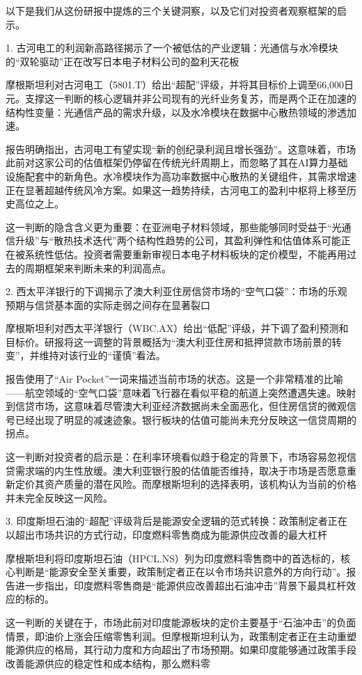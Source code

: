 \documentclass[11pt]{ctexart}
\begin{document}
以下是我们从这份研报中提炼的三个关键洞察，以及它们对投资者观察框架的启示。

1. 古河电工的利润新高路径揭示了一个被低估的产业逻辑：光通信与水冷模块的“双轮驱动”正在改写日本电子材料公司的盈利天花板

摩根斯坦利对古河电工（5801.T）给出“超配”评级，并将其目标价上调至66,000日元。支撑这一判断的核心逻辑并非公司现有的光纤业务复苏，而是两个正在加速的结构性变量：光通信产品的需求升级，以及水冷模块在数据中心散热领域的渗透加速。

报告明确指出，古河电工有望实现“新的创纪录利润且增长强劲”。这意味着，市场此前对这家公司的估值框架仍停留在传统光纤周期上，而忽略了其在AI算力基础设施配套中的新角色。水冷模块作为高功率数据中心散热的关键组件，其需求增速正在显著超越传统风冷方案。如果这一趋势持续，古河电工的盈利中枢将上移至历史高位之上。

这一判断的隐含含义更为重要：在亚洲电子材料领域，那些能够同时受益于“光通信升级”与“散热技术迭代”两个结构性趋势的公司，其盈利弹性和估值体系可能正在被系统性低估。投资者需要重新审视日本电子材料板块的定价模型，不能再用过去的周期框架来判断未来的利润高点。

2. 西太平洋银行的下调揭示了澳大利亚住房信贷市场的“空气口袋”：市场的乐观预期与信贷基本面的实际走弱之间存在显著裂口

摩根斯坦利对西太平洋银行（WBC.AX）给出“低配”评级，并下调了盈利预测和目标价。研报将这一调整的背景概括为“澳大利亚住房和抵押贷款市场前景的转变”，并维持对该行业的“谨慎”看法。

报告使用了“Air Pocket”一词来描述当前市场的状态。这是一个非常精准的比喻——航空领域的“空气口袋”意味着飞行器在看似平稳的航道上突然遭遇失速。映射到信贷市场，这意味着尽管澳大利亚经济数据尚未全面恶化，但住房信贷的微观信号已经出现了明显的减速迹象。银行板块的估值可能尚未充分反映这一信贷周期的拐点。

这一判断对投资者的启示是：在利率环境看似趋于稳定的背景下，市场容易忽视信贷需求端的内生性放缓。澳大利亚银行股的估值能否维持，取决于市场是否愿意重新定价其资产质量的潜在风险。而摩根斯坦利的选择表明，该机构认为当前的价格并未完全反映这一风险。

3. 印度斯坦石油的“超配”评级背后是能源安全逻辑的范式转换：政策制定者正在以超出市场共识的方式行动，印度燃料零售商成为能源供应改善的最大杠杆

摩根斯坦利将印度斯坦石油（HPCL.NS）列为印度燃料零售商中的首选标的，核心判断是“能源安全至关重要，政策制定者正在以令市场共识意外的方向行动”。报告进一步指出，印度燃料零售商是“能源供应改善超出石油冲击”背景下最具杠杆效应的标的。

这一判断的关键在于，市场此前对印度能源板块的定价主要基于“石油冲击”的负面情景，即油价上涨会压缩零售利润。但摩根斯坦利认为，政策制定者正在主动重塑能源供应的格局，其行动力度和方向超出了市场预期。如果印度能够通过政策手段改善能源供应的稳定性和成本结构，那么燃料零
\end{document}
